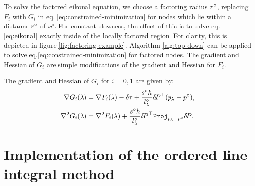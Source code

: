 \documentclass[smallcondensed]{svjour3}
\begin{document}
To solve the factored eikonal equation, we choose a factoring radius
$r^\circ$, replacing $F_i$ with $G_i$ in eq.\@
\ref{eq:constrained-minimization} for nodes which lie within a
distance $r^\circ$ of $x^\circ$. For constant slowness, the effect of
this is to solve eq.\@ \ref{eq:eikonal} exactly inside of the
locally factored region. For clarity, this is depicted in figure
\ref{fig:factoring-example}. Algorithm \ref{alg:top-down} can be
applied to solve eq.\@ \ref{eq:constrained-minimization} for
factored nodes. The gradient and Hessian of $G_i$ are simple
modifications of the gradient and Hessian for $F_i$.

\begin{lemma}
  The gradient and Hessian of $G_i$ for $i = 0, 1$ are given
  by:
  \begin{align}
    \label{eq:G-grad-hess}
    \nabla G_i(\lambda) &= \nabla F_i(\lambda) - {\delta \hspace{-0.05em} \tau} + \frac{s^\circ h}{l^\circ_\lambda} {\delta \hspace{-0.14em} P}^\top {(p_\lambda - p^\circ)}, \\
    \nabla^2 G_i(\lambda) &= \nabla^2 F_i(\lambda) + \frac{s^\circ h}{l^\circ_\lambda} {\delta \hspace{-0.14em} P}^\top \mathtt{Proj}^\perp_{p_\lambda - p^\circ} {\delta \hspace{-0.14em} P}.
  \end{align}
\end{lemma}

\section{Implementation of the ordered line integral
  method}\label{sec:implementation}
\end{document}
